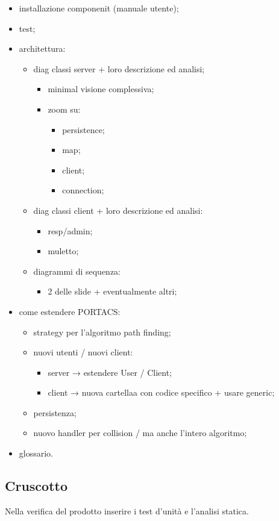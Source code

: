 \begin{itemize}
	\item installazione componenit (manuale utente);
	
	\item test;
	
	\item architettura:
	\begin{itemize}
	
	
	\item diag classi server + loro descrizione ed analisi;
	\begin{itemize}
	\item minimal visione complessiva;
	
	\item zoom su:
	\begin{itemize}
	\item persistence;
	
	\item map;
	
	\item client;
	
	\item connection;
\end{itemize}
\end{itemize}
	\item diag classi client + loro descrizione ed analisi:
	\begin{itemize}
	\item resp/admin;
	
	\item muletto;
\end{itemize}
	\item diagrammi di sequenza:
	\begin{itemize}
		\item 2 delle slide + eventualmente altri;
	\end{itemize}
\end{itemize}
	\item come estendere PORTACS:
	\begin{itemize}
	
	\item strategy per l’algoritmo path finding;
	
	\item nuovi utenti / nuovi client:
	\begin{itemize}
	
	\item server → estendere User / Client;
	
	\item client → nuova cartellaa con codice specifico + usare generic;
\end{itemize}
	
	\item persistenza;
	
	\item nuovo handler per collision / ma anche l’intero algoritmo;
\end{itemize}
	
	\item glossario.
	\end{itemize}

\subsection{Cruscotto}
Nella verifica del prodotto inserire i test d'unità e l'analisi statica.